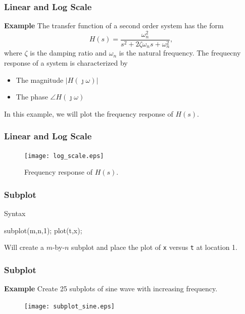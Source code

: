 \documentclass[compress]{beamer}  %
\begin{document}
\begin{frame}[fragile]
\frametitle{Linear and Log Scale}
\textbf{Example} 
The transfer function of a second order system has the form
$$H(s) = \frac{\omega_n^2}{s^2 + 2 \zeta \omega_n s + \omega_n^2},$$
where $\zeta$ is the damping ratio and $\omega_n$ is the natural frequency.
\pause
The frequecny response of a system is characterized by
\begin{itemize}
    \item The magnitude $|H(\jmath \omega)|$
    \item The phase $\angle H(\jmath \omega)$
\end{itemize}

In this example, we will plot the frequency response of $H(s)$.

\end{frame}
\begin{frame}[fragile]
\frametitle{Linear and Log Scale}

\setcounter{subfigure}{0}
\begin{figure}
    \centering
    \texttt{[image: log\_scale.eps]}
    \caption{Frequency response of $H(s)$.}
\end{figure}

\end{frame}
\begin{frame}[fragile]
\frametitle{Subplot}

\begin{block}{Syntax}
          \begin{matlabcodebeamer}[frame=none]
          subplot(m,n,1);
          plot(t,x);
          \end{matlabcodebeamer}
Will create a $m$-by-$n$ subplot and place the plot of \texttt{x} versus \texttt{t} at location 1.
\end{block}
\end{frame}
\begin{frame}[fragile]
\frametitle{Subplot}
\textbf{Example} 
Create 25 subplots of sine wave with increasing frequency.
\setcounter{subfigure}{0}
\begin{figure}
    \centering
    \texttt{[image: subplot\_sine.eps]}
\end{figure}

\end{frame}
\end{document}
